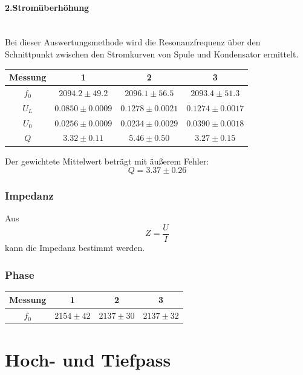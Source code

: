 \documentclass[12pt,a4paper]{article}
\begin{document}
\paragraph{2.Stromüberhöhung}\mbox{}\\
Bei dieser Auswertungsmethode wird die Resonanzfrequenz über den Schnittpunkt zwischen den Stromkurven von Spule und Kondensator ermittelt. 

\begin{table}
\begin{tabular}{|c|c|c|c|}
\hline
Messung & 1 & 2 & 3\\
\hline
$f_0$ & $2094.2\pm 49.2$ & $2096.1\pm 56.5$ & $2093.4\pm 51.3$\\
\hline
$U_L$ & $0.0850\pm 0.0009$ & $0.1278\pm 0.0021$ & $0.1274\pm 0.0017$ \\
\hline
$U_0$ & $0.0256\pm 0.0009$ & $0.0234\pm 0.0029$ & $0.0390\pm 0.0018$ \\
\hline
$Q$ & $3.32\pm 0.11$ & $5.46\pm 0.50$ & $3.27\pm 0.15$ \\
\hline
\end{tabular}
\end{table}
Der gewichtete Mittelwert beträgt mit äußerem Fehler:
\begin{equation}
Q = 3.37\pm 0.26 
\end{equation}

\subsubsection{Impedanz}
Aus
\begin{equation}
Z = \dfrac{U}{I}
\end{equation}
kann die Impedanz bestimmt werden.

\subsubsection{Phase}
\begin{table}
\begin{tabular}{|c|c|c|c|}
\hline
Messung & 1 & 2 & 3\\
\hline
$f_0$ & $2154\pm 42$ &$ 2137\pm 30$ & $2137\pm 32$\\
\hline
\end{tabular}
\end{table}


\section{Hoch- und Tiefpass}
\end{document}
